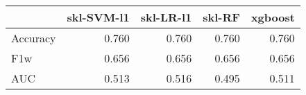 \begin{tabular}{lrrrr}
\toprule
{} &  skl-SVM-l1 &  skl-LR-l1 &  skl-RF &  xgboost \\
\midrule
Accuracy &       0.760 &      0.760 &   0.760 &    0.760 \\
F1w      &       0.656 &      0.656 &   0.656 &    0.656 \\
AUC      &       0.513 &      0.516 &   0.495 &    0.511 \\
\bottomrule
\end{tabular}
